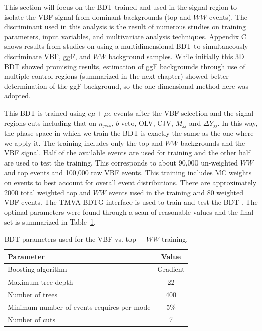 This section will focus on the BDT trained and used in the signal region to isolate the VBF signal from dominant backgrounds (top and $WW$ events). The discriminant used in this analysis is the result of numerous studies on training parameters, input variables, and multivariate analysis techniques. Appendix C shows results from studies on using a multidimensional BDT to simultaneously discriminate VBF, ggF, and $WW$ background samples. While initially this 3D BDT showed promising results, estimation of ggF backgrounds through use of multiple control regions (summarized in the next chapter) showed better determination of the ggF background, so the one-dimensional method here was adopted. 

This BDT is trained using $e\mu+\mu e$ events after the VBF selection and the signal regions cuts including that on $n_{jets}$, $b$-veto, OLV, CJV, $M_{jj}$ and $\Delta Y_{jj}$. In this way, the phase space in which we train the BDT is exactly the same as the one where we apply it. The training includes only the top and $WW$ backgrounds and the VBF signal. Half of the available events are used for training and the other half are used to test the training. This corresponds to about 90,000 un-weighted $WW$ and top events and 100,000 raw VBF events. This training includes MC weights on events to best account for overall event distributions. There are approximately 2000 total weighted top and $WW$ events used in the training and 80 weighted VBF events. 
The TMVA BDTG interface is used to train and test the BDT \cite{TMVA}. The optimal parameters were found through a scan of reasonable values and the final set is summarized in Table~\ref{tab:SRBDTparameters}.
\begin{table}[h!]
\centering
\begin{tabular}{|l|c|}
\hline
Parameter                                    & Value     \\
\hline
Boosting algorithm                           &  Gradient  \\
Maximum tree depth                           &  22       \\
Number of trees                              &  400     \\
Minimum number of events requires per mode   &  5\%      \\
Number of cuts                               &  7        \\
\hline
\end{tabular}
\caption{BDT parameters used for the VBF vs. top + $WW$ training.} 
\label{tab:SRBDTparameters}
\end{table}
